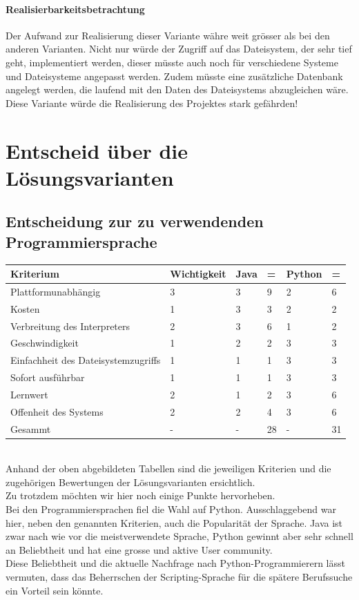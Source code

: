 \documentclass[10pt,paper=a4,final]{scrartcl}
\begin{document}
\paragraph{Realisierbarkeitsbetrachtung}
Der Aufwand zur Realisierung dieser Variante währe weit grösser als bei den anderen Varianten. Nicht nur würde der Zugriff auf das Dateisystem, der sehr tief geht, implementiert werden, dieser müsste auch noch für verschiedene Systeme und Dateisysteme angepasst werden. Zudem müsste eine zusätzliche Datenbank angelegt werden, die laufend mit den Daten des Dateisystems abzugleichen wäre.\\
Diese Variante würde die Realisierung des Projektes stark gefährden!

\section{Entscheid über die Lösungsvarianten}
\subsection{Entscheidung zur zu verwendenden Programmiersprache}
\begin{tabularx}{\textwidth}{ |l|X|X|l|X|l| }
\hline
\bf Kriterium & \bf Wichtigkeit & \bf Java & \bf = & \bf Python & \bf = \\ \hline
Plattformunabhängig & 3 & 3 & 9 & 2 & 6\\ \hline
Kosten & 1 & 3 & 3 & 2 & 2 \\ \hline
Verbreitung des Interpreters & 2 & 3 & 6 & 1 & 2 \\ \hline
Geschwindigkeit & 1 & 2 & 2 & 3 & 3 \\ \hline
Einfachheit des Dateisystemzugriffs & 1 & 1 & 1 & 3 & 3 \\ \hline
Sofort ausf\"uhrbar & 1 & 1 & 1 & 3 & 3 \\ \hline
Lernwert & 2 & 1 & 2 & 3 & 6 \\ \hline
Offenheit des Systems & 2 & 2 & 4 & 3 & 6 \\ \hline
Gesammt & - & - & 28 \cellcolor{red!80!}& - & 31 \cellcolor{green!80!} \\ \hline
\end{tabularx}
\\
Anhand der oben abgebildeten Tabellen sind die jeweiligen Kriterien und die zugehörigen Bewertungen der Lösungsvarianten ersichtlich.\\
Zu trotzdem möchten wir hier noch einige Punkte hervorheben.\\
Bei den Programmiersprachen fiel die Wahl auf Python. Ausschlaggebend war hier, neben den genannten Kriterien, auch die Popularität der Sprache. Java ist zwar nach wie vor die meistverwendete Sprache, Python gewinnt aber sehr schnell an Beliebtheit und hat eine grosse und aktive User community.\\
Diese Beliebtheit und die aktuelle Nachfrage nach Python-Programmierern lässt vermuten, dass das Beherrschen der Scripting-Sprache für die spätere Berufssuche ein Vorteil sein könnte.
\end{document}
